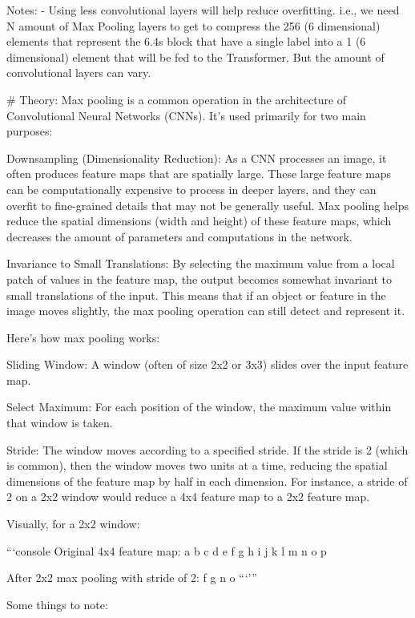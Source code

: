 Notes: 
- Using less convolutional layers will help reduce overfitting. i.e., we need N amount of 
Max Pooling layers to get to compress the 256 (6 dimensional) elements that represent the 6.4s block that 
have a single label into a 1 (6 dimensional) element that will be fed to the Transformer. But the amount of convolutional
layers can vary. 








# Theory: 
Max pooling is a common operation in the architecture of Convolutional Neural Networks (CNNs). It's used primarily for two main purposes:

    Downsampling (Dimensionality Reduction): As a CNN processes an image, it often produces feature maps that are spatially large. These large feature maps can be computationally expensive to process in deeper layers, and they can overfit to fine-grained details that may not be generally useful. Max pooling helps reduce the spatial dimensions (width and height) of these feature maps, which decreases the amount of parameters and computations in the network.

    Invariance to Small Translations: By selecting the maximum value from a local patch of values in the feature map, the output becomes somewhat invariant to small translations of the input. This means that if an object or feature in the image moves slightly, the max pooling operation can still detect and represent it.

Here's how max pooling works:

    Sliding Window: A window (often of size 2x2 or 3x3) slides over the input feature map.

    Select Maximum: For each position of the window, the maximum value within that window is taken.

    Stride: The window moves according to a specified stride. If the stride is 2 (which is common), then the window moves two units at a time, reducing the spatial dimensions of the feature map by half in each dimension. For instance, a stride of 2 on a 2x2 window would reduce a 4x4 feature map to a 2x2 feature map.

Visually, for a 2x2 window:

```console
Original 4x4 feature map:
a b c d
e f g h
i j k l
m n o p

After 2x2 max pooling with stride of 2:
f g
n o
```'''


Some things to note:

